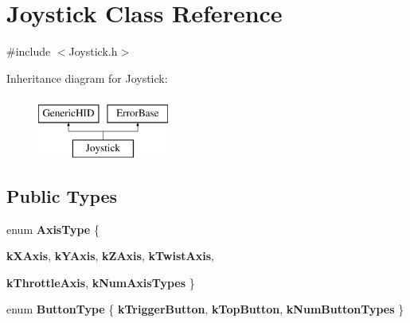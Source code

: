 \hypertarget{classJoystick}{
\section{Joystick Class Reference}
\label{classJoystick}
}


{\ttfamily \#include $<$Joystick.h$>$}

Inheritance diagram for Joystick:\begin{figure}[H]
\begin{center}
\leavevmode
\includegraphics[height=2.000000cm]{classJoystick}
\end{center}
\end{figure}
\subsection*{Public Types}
\begin{DoxyCompactItemize}
\item 
enum {\bfseries AxisType} \{ \par
{\bfseries kXAxis}, 
{\bfseries kYAxis}, 
{\bfseries kZAxis}, 
{\bfseries kTwistAxis}, 
\par
{\bfseries kThrottleAxis}, 
{\bfseries kNumAxisTypes}
 \}
\item 
enum {\bfseries ButtonType} \{ {\bfseries kTriggerButton}, 
{\bfseries kTopButton}, 
{\bfseries kNumButtonTypes}
 \}
\end{DoxyCompactItemize}
